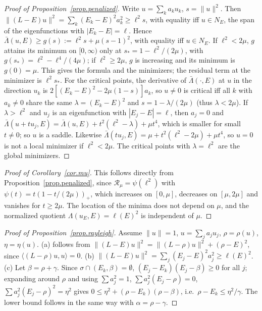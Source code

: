 \documentclass[10pt]{amsart}
\theoremstyle{definition}
\theoremstyle{remark}
\theoremstyle{plain}
\begin{document}
\begin{proof}[Proof of Proposition~\ref{prop.penalized}]
Write $u=\sum_ka_ku_k$, $s=\|u\|^2$. Then $\|(L-E)u\|^2=\sum_k(E_k-E)^2a_k^2\ge \ell^2s$, with equality
iff $u\in N_E$, the span of the eigenfunctions with $|E_k-E|=\ell$. Hence
$\bar\Lambda(u,E)\ge g(s):=\ell^2s+\mu(s-1)^2$, with equality iff $u\in N_E$. If $\ell^2<2\mu$, $g$ attains its
minimum on $[0,\infty)$ only at $s_*=1-\ell^2/(2\mu)$, with $g(s_*)=\ell^2-\ell^4/(4\mu)$; if $\ell^2\ge2\mu$, $g$ is
increasing and its minimum is $g(0)=\mu$. This gives the formula and the minimizers; the residual term
at the minimizer is $\ell^2s_*$. For the critical points, the derivative of $\bar\Lambda(\cdot,E)$ at $u$ in
the direction $u_k$ is $2[(E_k-E)^2-2\mu(1-s)]a_k$, so $u\ne0$ is critical iff all $k$ with
$a_k\ne0$ share the same $\lambda=(E_k-E)^2$ and $s=1-\lambda/(2\mu)$ (thus $\lambda<2\mu$). If
$\lambda>\ell^2$ and $u_j$ is an eigenfunction with $|E_j-E|=\ell$, then $a_j=0$ and
$\bar\Lambda(u+tu_j,E)=\bar\Lambda(u,E)+t^2(\ell^2-\lambda)+\mu t^4$, which is smaller for small $t\ne0$; so
$u$ is a saddle. Likewise $\bar\Lambda(tu_j,E)=\mu+t^2(\ell^2-2\mu)+\mu t^4$, so $u=0$ is not a local
minimizer if $\ell^2<2\mu$. The critical points with $\lambda=\ell^2$ are the global minimizers.
\end{proof}

\begin{proof}[Proof of Corollary~\ref{cor.mu}]
This follows directly from Proposition~\ref{prop.penalized}, since $\mathcal R_\mu=\psi(\ell^2)$ with
$\psi(t)=t(1-t/(2\mu))_+$, which increases on $[0,\mu]$, decreases on $[\mu,2\mu]$ and vanishes for
$t\ge2\mu$. The location of the minima does not depend on $\mu$, and the normalized quotient
$\Lambda(u_E,E)=\ell(E)^2$ is independent of $\mu$.
\end{proof}

\begin{proof}[Proof of Proposition~\ref{prop.rayleigh}]
Assume $\|u\|=1$, $u=\sum_ja_ju_j$, $\rho=\rho(u)$, $\eta=\eta(u)$. (a) follows from
$\|(L-E)u\|^2=\|(L-\rho)u\|^2+(\rho-E)^2$, since $\langle(L-\rho)u,u\rangle=0$. (b) $\|(L-E)u\|^2=
\sum_j(E_j-E)^2a_j^2\ge \ell(E)^2$. (c) Let $\beta=\rho+\gamma$. Since $\sigma\cap(E_k,\beta)=\emptyset$,
$(E_j-E_k)(E_j-\beta)\ge0$ for all $j$; expanding around $\rho$ and using $\sum a_j^2=1$,
$\sum a_j^2(E_j-\rho)=0$, $\sum a_j^2(E_j-\rho)^2=\eta^2$ gives $0\le\eta^2+(\rho-E_k)(\rho-\beta)$, i.e.\
$\rho-E_k\le\eta^2/\gamma$. The lower bound follows in the same way with $\alpha=\rho-\gamma$.
\end{proof}
\end{document}
